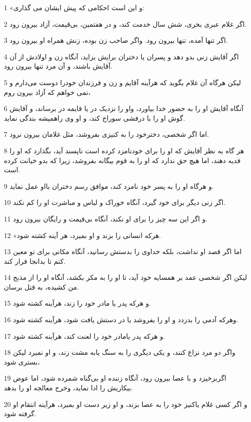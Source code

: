 \par 1 «و این است احکامی که پیش ایشان می گذاری:
\par 2 اگر غلام عبری بخری، شش سال خدمت کند، و در هفتمین، بی‌قیمت، آزاد بیرون رود.
\par 3 اگر تنها آمده، تنها بیرون رود. واگر صاحب زن بوده، زنش همراه او بیرون رود.
\par 4 اگر آقایش زنی بدو دهد و پسران یا دختران برایش بزاید، آنگاه زن و اولادش از آن آقایش باشند، و آن مرد تنها بیرون رود.
\par 5 لیکن هرگاه آن غلام بگوید که هرآینه آقایم و زن و فرزندان خودرا دوست می‌دارم و نمی خواهم که آزاد بیرون روم،
\par 6 آنگاه آقایش او را به حضور خدا بیاورد، واو را نزدیک در یا قایمه در برساند، و آقایش گوش او را با درفشی سوراخ کند، و او وی راهمیشه بندگی نماید.
\par 7 اما اگر شخصی، دخترخود را به کنیزی بفروشد، مثل غلامان بیرون نرود.
\par 8 هر گاه به نظر آقایش که او را برای خودنامزد کرده است ناپسند آید، بگذارد که او را فدیه دهند، اما هیچ حق ندارد که او را به قوم بیگانه بفروشد، زیرا که بدو خیانت کرده است.
\par 9 و هرگاه او را به پسر خود نامزد کند، موافق رسم دختران بااو عمل نماید.
\par 10 اگر زنی دیگر برای خود گیرد، آنگاه خوراک و لباس و مباشرت او را کم نکند.
\par 11 و اگر این سه چیز را برای او نکند، آنگاه بی‌قیمت و رایگان بیرون رود.
\par 12 «هر‌که انسانی را بزند و او بمیرد، هر آینه کشته شود.
\par 13 اما اگر قصد او نداشت، بلکه خداوی را بدستش رسانید، آنگاه مکانی برای تو معین کنم تا بدانجا فرار کند.
\par 14 لیکن اگر شخصی عمد بر همسایه خود آید، تا او را به مکر بکشد، آنگاه او را از مذبح من کشیده، به قتل برسان.
\par 15 و هر‌که پدر یا مادر خود را زند، هرآینه کشته شود.
\par 16 وهر‌که آدمی را بدزدد و او را بفروشد یا در دستش یافت شود، هرآینه کشته شود.
\par 17 و هر‌که پدر یامادر خود را لعنت کند، هرآینه کشته شود.
\par 18 واگر دو مرد نزاع کنند، و یکی دیگری را به سنگ یابه مشت زند، و او نمیرد لیکن بستری شود،
\par 19 اگربرخیزد و با عصا بیرون رود، آنگاه زننده او بی‌گناه شمرده شود، اما عوض بیکاریش را ادا نماید، وخرج معالجه او را بدهد.
\par 20 و اگر کسی غلام یاکنیز خود را به عصا بزند، و او زیر دست او بمیرد، هرآینه انتقام او گرفته شود.
